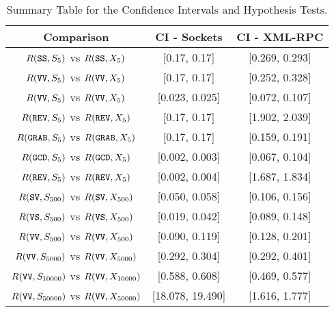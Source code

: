 \documentclass{sig-alternate}
\begin{document}
\begin{table*}[t]

\begin{center}
\begin{tabular}{|c||c|c|}

\hline
 {\bf Comparison}     &{\bf CI - Sockets} & {\bf CI - XML-RPC} \\
\hline
 $R(\mbox{\texttt{SS}},S_{5})$ vs $ R(\mbox{\texttt{SS}},X_{5})$  & [0.17, 0.17]   & [0.269, 0.293] \\
\hline
 $R(\mbox{\texttt{VV}},S_{5})$ vs $R(\mbox{\texttt{VV}},X_{5})$   & [0.17, 0.17]   & [0.252, 0.328] \\
\hline
 $R(\mbox{\texttt{VV}},S_{5})$ vs $R(\mbox{\texttt{VV}},X_{5})$  & [0.023, 0.025]   & [0.072, 0.107] \\
\hline
 $R(\mbox{\texttt{REV}},S_{5})$ vs $R(\mbox{\texttt{REV}},X_{5})$  & [0.17, 0.17]   & [1.902, 2.039] \\
\hline
 $R(\mbox{\texttt{GRAB}},S_{5})$ vs $R(\mbox{\texttt{GRAB}},X_{5})$ & [0.17, 0.17]   & [0.159, 0.191] \\
\hline
 $R(\mbox{\texttt{GCD}},S_{5})$ vs $R(\mbox{\texttt{GCD}},X_{5})$  & [0.002, 0.003]   & [0.067, 0.104] \\
\hline
 $R(\mbox{\texttt{REV}},S_{5})$ vs $R(\mbox{\texttt{REV}},X_{5})$& [0.002, 0.004]   & [1.687, 1.834] \\
\hline
 $R(\mbox{\texttt{SV}},S_{500})$ vs $R(\mbox{\texttt{SV}},X_{500})$& [0.050, 0.058]   & [0.106, 0.156] \\
\hline
 $R(\mbox{\texttt{VS}},S_{500})$ vs $R(\mbox{\texttt{VS}},X_{500})$& [0.019, 0.042]   & [0.089, 0.148] \\
\hline
 $R(\mbox{\texttt{VV}},S_{500})$ vs $R(\mbox{\texttt{VV}},X_{500})$ & [0.090, 0.119]   & [0.128, 0.201] \\
\hline
 $R(\mbox{\texttt{VV}},S_{5000})$ vs $R(\mbox{\texttt{VV}},X_{5000})$   & [0.292, 0.304] & [0.292, 0.401] \\
\hline
 $ R(\mbox{\texttt{VV}},S_{10000})$ vs $ R(\mbox{\texttt{VV}},X_{10000})$   & [0.588, 0.608] & [0.469, 0.577] \\
\hline
 $ R(\mbox{\texttt{VV}},S_{50000})$ vs $ R(\mbox{\texttt{VV}},X_{50000})$  & [18.078, 19.490]  & [1.616, 1.777] \\

\hline
\end{tabular}
\end{center}

\vspace*{-.15in}

\caption{Summary Table for the Confidence Intervals and Hypothesis Tests.}
\label{tab:XMLResults}

\vspace*{-.1in}

\end{table*}
\end{document}

